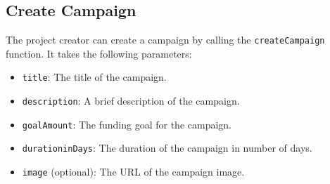 \documentclass[12pt,reqno]{article}
\begin{document}
\subsection{Create Campaign}
The project creator can create a campaign by calling the \texttt{createCampaign} function. It takes 
the following parameters: \\ 
\begin{itemize}
    \item \texttt{title}: The title of the campaign.
    \item \texttt{description}: A brief description of the campaign.
    \item \texttt{goalAmount}: The funding goal for the campaign.
    \item \texttt{durationinDays}: The duration of the campaign in number of days.
    \item \texttt{image} (optional): The URL of the campaign image.
\end{itemize}
\end{document}
